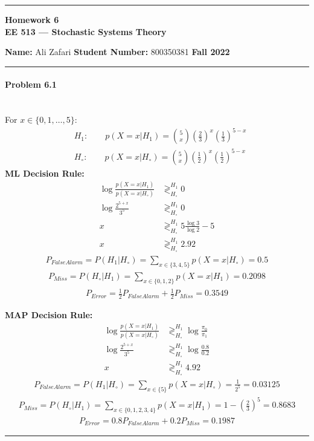 \documentclass[12pt, letterpaper]{scrartcl}
\begin{document}
    \begin{center}
    	\hrule
    	\vspace{0.4cm}
    	{\textbf { {\large Homework 6} \\ EE 513 --- Stochastic Systems Theory}}
    \end{center}
    { \textbf{Name:} Ali Zafari \hspace{\fill} \textbf{Student Number:} 800350381 \hspace{\fill} \textbf{Fall 2022} } \newline\hrule
\paragraph*{Problem 6.1} \hfill\\
For $x\in\{0,1,\dots,5\}$:
\begin{align*}
    &H_1 : \qquad p(X=x|H_1)={5 \choose x}(\frac{2}{3})^x(\frac{1}{3})^{5-x}\\
    &H_\circ : \qquad p(X=x|H_\circ)={5 \choose x}(\frac{1}{2})^x(\frac{1}{2})^{5-x}
\end{align*}
\textbf{ML Decision Rule:}
\begin{align*}
    \log \frac{p(X=x|H_1)}{p(X=x|H_\circ)} &\mathop{\gtrless}^{H_1}_{H_\circ} 0\\
    \log{\frac{2^{5+x}}{3^5}}&\mathop{\gtrless}^{H_1}_{H_\circ} 0\\
    x&\mathop{\gtrless}^{H_1}_{H_\circ} 5\frac{\log3}{\log2}-5\\
    x&\mathop{\gtrless}^{H_1}_{H_\circ}2.92
\end{align*}
\begin{align*}
    P_{FalseAlarm}=P(H_1|H_\circ)=\sum_{x\in\{3,4,5\}}p(X=x|H_\circ)=0.5
\end{align*}
\begin{align*}
    P_{Miss}=P(H_\circ|H_1)=\sum_{x\in\{0,1,2\}}p(X=x|H_1)=0.2098
\end{align*}
\begin{align*}
    P_{Error}=\frac{1}{2}P_{FalseAlarm}+\frac{1}{2}P_{Miss}=0.3549
\end{align*}

\textbf{MAP Decision Rule:}
\begin{align*}
    \log \frac{p(X=x|H_1)}{p(X=x|H_\circ)} &\mathop{\gtrless}^{H_1}_{H_\circ} \log\frac{\pi_0}{\pi_1}\\
    \log{\frac{2^{5+x}}{3^5}}&\mathop{\gtrless}^{H_1}_{H_\circ} \log\frac{0.8}{0.2}\\
    x&\mathop{\gtrless}^{H_1}_{H_\circ}4.92
\end{align*}
\begin{align*}
    P_{FalseAlarm}=P(H_1|H_\circ)=\sum_{x\in\{5\}}p(X=x|H_\circ)=\frac{1}{2^5}=0.03125
\end{align*}
\begin{align*}
    P_{Miss}=P(H_\circ|H_1)=\sum_{x\in\{0,1,2,3,4\}}p(X=x|H_1)=1-(\frac{2}{3})^5=0.8683
\end{align*}
\begin{align*}
    P_{Error}=0.8P_{FalseAlarm}+0.2P_{Miss}=0.1987
\end{align*}
\hrule
\end{document}
